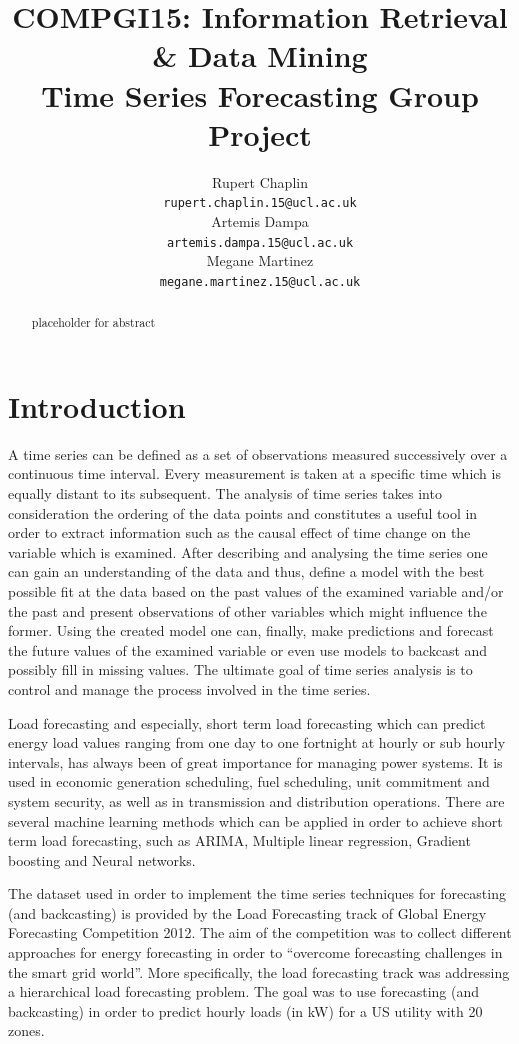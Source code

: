\documentclass{article} %
\title{COMPGI15: Information Retrieval \& Data Mining \\
Time Series Forecasting Group Project}
\author{
Rupert Chaplin\\
\texttt{rupert.chaplin.15@ucl.ac.uk} \\
\And
Artemis Dampa\\
\texttt{artemis.dampa.15@ucl.ac.uk} \\
\And
Megane Martinez\\
\texttt{megane.martinez.15@ucl.ac.uk} \\
}
\begin{document}
\maketitle

\begin{abstract}
placeholder for abstract
\end{abstract}

\section*{Introduction}
A time series can be defined as a set of observations measured successively over a continuous time interval. Every measurement is taken at a specific time which is equally distant to its subsequent. The analysis of time series takes into consideration the ordering of the data points and constitutes a useful tool in order to extract information such as the causal effect of time change on the variable which is examined. After describing and analysing the time series one can gain an understanding of the data and thus, define a model with the best possible fit at the data based on the past values of the examined variable and/or the past and present observations of other variables which might influence the former. Using the created model one can, finally, make predictions and forecast the future values of the examined variable or even use models to backcast and possibly fill in missing values. The ultimate goal of time series analysis is to control and manage the process involved in the time series.

Load forecasting and especially, short term load forecasting which can predict energy load values ranging from one day to one fortnight at hourly or sub hourly intervals, has always been of great importance for managing power systems. It is used in economic generation scheduling, fuel scheduling, unit commitment and system security, as well as in transmission and distribution operations. There are several machine learning methods which can be applied in order to achieve short term load forecasting, such as ARIMA, Multiple linear regression, Gradient boosting and Neural networks.

The dataset used in order to implement the time series techniques for forecasting (and backcasting) is provided by the Load Forecasting track of Global Energy Forecasting Competition 2012. The aim of the competition was to collect different approaches for energy forecasting in order to “overcome forecasting challenges in the smart grid world”. More specifically, the load forecasting track was addressing a hierarchical load forecasting problem. The goal was to use forecasting (and backcasting) in order to predict hourly loads (in kW) for a US utility with 20 zones.
\end{document}
